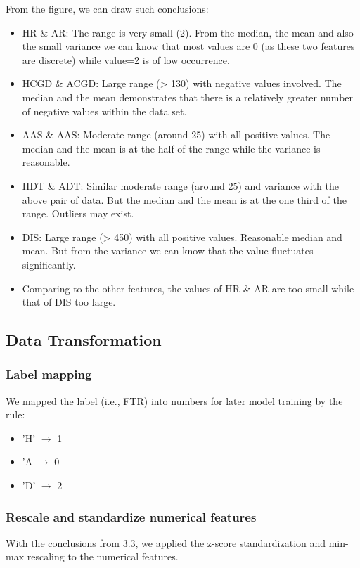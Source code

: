 \documentclass{article}
\begin{document}
From the figure, we can draw such conclusions:
\begin{itemize}
\item HR \& AR: The range is very small (2). From the median, the mean and also the small variance we can know that most values are 0 (as these two features are discrete) while value=2 is of low occurrence.
\item HCGD \& ACGD: Large range (> 130) with negative values involved. The median and the mean demonstrates that there is a relatively greater number of negative values within the data set.
\item AAS \& AAS: Moderate range (around 25) with all positive values. The median and the mean is at the half of the range while the variance is reasonable.
\item HDT \& ADT: Similar moderate range (around 25) and variance with the above pair of data. But the median and the mean is at the one third of the range. Outliers may exist.
\item DIS: Large range (> 450) with all positive values. Reasonable median and mean. But from the variance we can know that the value fluctuates significantly.
\item Comparing to the other features, the values of HR \& AR are too small while that of DIS too large.
\end{itemize}

\subsection{Data Transformation}
\subsubsection{Label mapping}
We mapped the label (i.e., FTR) into numbers for later model training by the rule:
\begin{itemize}
\item 'H' $\to$ 1
\item 'A $\to$ 0
\item 'D' $\to$ 2
\end{itemize}

\subsubsection{Rescale and standardize numerical features} \label{`}
With the conclusions from 3.3, we applied the z-score standardization and min-max rescaling to the numerical features.
\end{document}
